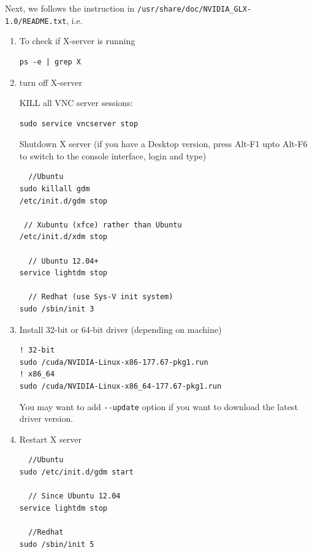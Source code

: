 Next, we follows the instruction in 
\verb!/usr/share/doc/NVIDIA_GLX-1.0/README.txt!, i.e.

\begin{enumerate}
  \item To check if X-server is running
\begin{verbatim}
ps -e | grep X
\end{verbatim}

  \item turn off X-server
  
KILL all VNC server sessions:
\begin{verbatim}
sudo service vncserver stop
\end{verbatim}

Shutdown X server (if you have a Desktop version, press Alt-F1 upto
Alt-F6 to switch to the console interface, login and type)
\begin{verbatim}
  //Ubuntu
sudo killall gdm   
/etc/init.d/gdm stop

 // Xubuntu (xfce) rather than Ubuntu
/etc/init.d/xdm stop

  // Ubuntu 12.04+
service lightdm stop

  // Redhat (use Sys-V init system)
sudo /sbin/init 3
\end{verbatim}

\item Install 32-bit or 64-bit driver (depending on machine)
\begin{verbatim}
! 32-bit
sudo /cuda/NVIDIA-Linux-x86-177.67-pkg1.run  
! x86_64
sudo /cuda/NVIDIA-Linux-x86_64-177.67-pkg1.run
\end{verbatim}

You may want to add \verb!--update! option if you want to download the
latest driver version. 

\item Restart X server
\begin{verbatim}
  //Ubuntu
sudo /etc/init.d/gdm start

  // Since Ubuntu 12.04
service lightdm stop

  //Redhat
sudo /sbin/init 5
\end{verbatim}
\end{enumerate}


